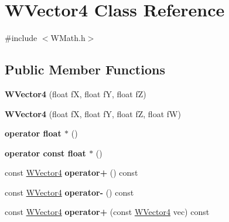 \hypertarget{class_w_vector4}{}\section{W\+Vector4 Class Reference}
\label{class_w_vector4}


{\ttfamily \#include $<$W\+Math.\+h$>$}

\subsection*{Public Member Functions}
\begin{DoxyCompactItemize}
\item 
{\bfseries W\+Vector4} (float fX, float fY, float fZ)\hypertarget{class_w_vector4_a86fb88d81a6b25bb8f3fdb7baeeb7a47}{}\label{class_w_vector4_a86fb88d81a6b25bb8f3fdb7baeeb7a47}

\item 
{\bfseries W\+Vector4} (float fX, float fY, float fZ, float fW)\hypertarget{class_w_vector4_ae75a016090cc61a740b0c74ef6d22175}{}\label{class_w_vector4_ae75a016090cc61a740b0c74ef6d22175}

\item 
{\bfseries operator float $\ast$} ()\hypertarget{class_w_vector4_a3a5cd6f16c62c6dd2805768e4782e6f8}{}\label{class_w_vector4_a3a5cd6f16c62c6dd2805768e4782e6f8}

\item 
{\bfseries operator const float $\ast$} ()\hypertarget{class_w_vector4_acf74b304e89d2d58284ef6d672c00158}{}\label{class_w_vector4_acf74b304e89d2d58284ef6d672c00158}

\item 
const \hyperlink{class_w_vector4}{W\+Vector4} {\bfseries operator+} () const \hypertarget{class_w_vector4_ac31d822dbca87babf6ce35e91c4e3197}{}\label{class_w_vector4_ac31d822dbca87babf6ce35e91c4e3197}

\item 
const \hyperlink{class_w_vector4}{W\+Vector4} {\bfseries operator-\/} () const \hypertarget{class_w_vector4_a735185dd3ee45312d15d9b5f3fe2e3ca}{}\label{class_w_vector4_a735185dd3ee45312d15d9b5f3fe2e3ca}

\item 
const \hyperlink{class_w_vector4}{W\+Vector4} {\bfseries operator+} (const \hyperlink{class_w_vector4}{W\+Vector4} vec) const \hypertarget{class_w_vector4_ac4b508e012c6a3343050d5e8994ea7a9}{}\label{class_w_vector4_ac4b508e012c6a3343050d5e8994ea7a9}


\end{DoxyCompactItemize}
